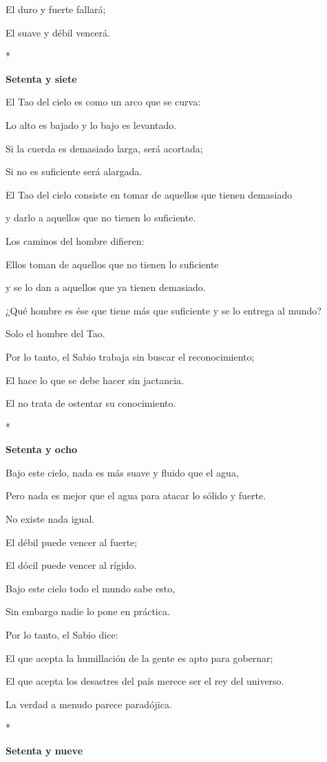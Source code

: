El duro y fuerte fallará;

El suave y débil vencerá.

*

\textbf{Setenta y siete}

El Tao del cielo es como un arco que se curva:

Lo alto es bajado y lo bajo es levantado.

Si la cuerda es demasiado larga, será acortada;

Si no es suficiente será alargada.

El Tao del cielo consiste en tomar de aquellos que tienen demasiado

y darlo a aquellos que no tienen lo suficiente.

Los caminos del hombre difieren:

Ellos toman de aquellos que no tienen lo suficiente

y se lo dan a aquellos que ya tienen demasiado.

¿Qué hombre es ése que tiene más que suficiente y se lo entrega al
mundo?

Solo el hombre del Tao.

Por lo tanto, el Sabio trabaja sin buscar el reconocimiento;

El hace lo que se debe hacer sin jactancia.

El no trata de ostentar su conocimiento.

*

\textbf{Setenta y ocho}

Bajo este cielo, nada es más suave y fluido que el agua,

Pero nada es mejor que el agua para atacar lo sólido y fuerte.

No existe nada igual.

El débil puede vencer al fuerte;

El dócil puede vencer al rígido.

Bajo este cielo todo el mundo sabe esto,

Sin embargo nadie lo pone en práctica.

Por lo tanto, el Sabio dice:

El que acepta la humillación de la gente es apto para gobernar;

El que acepta los desastres del país merece ser el rey del universo.

La verdad a menudo parece paradójica.

*

\textbf{Setenta y nueve}

